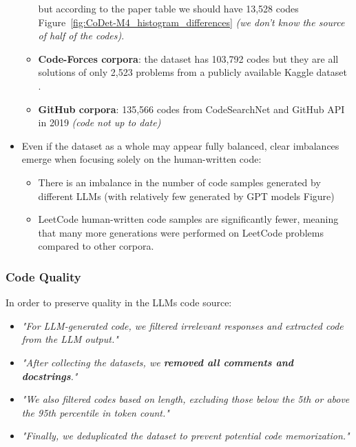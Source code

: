 \begin{itemize}
\begin{itemize}
            but according to the paper table we should have 13,528 codes Figure~\ref{fig:CoDet-M4_histogram_differences} 
            \textit{(we don't know the source of half of the codes)}.
            \item \textbf{Code-Forces corpora}: the dataset has 103,792 codes but they are all
            solutions of only 2,523 problems from 
            a publicly available Kaggle dataset \cite{CodeforcesKaggle}.
            \item \textbf{GitHub corpora}: 135,566 codes from 
            CodeSearchNet \cite{husain2019codesearchnet} 
            and GitHub API in 2019 \textit{(code not up to date)}
        \end{itemize}
    \item Even if the dataset as a whole may appear fully balanced, 
    clear imbalances emerge when focusing solely on the human-written code:
            \begin{itemize}
            \item There is an imbalance in the number of code samples generated by 
            different LLMs (with relatively few generated by GPT models 
            Figure)
            \item LeetCode human-written code samples are significantly 
            fewer, meaning that many more generations were performed on 
            LeetCode problems compared to other corpora.
    \end{itemize}
\end{itemize}






\subsubsection*{Code Quality}
In order to preserve quality in the LLMs code source:
\begin{itemize}
    \item \textit{"For LLM-generated code, we filtered irrelevant responses and extracted code from the LLM output."}
    \item \textit{"After collecting the datasets, we \textbf{removed all comments and docstrings}."}
    \item \textit{"We also filtered codes based on length, excluding those below the 5th or above the 95th percentile in token count."}
    \item \textit{"Finally, we deduplicated the dataset to prevent potential code memorization."}
\end{itemize}


